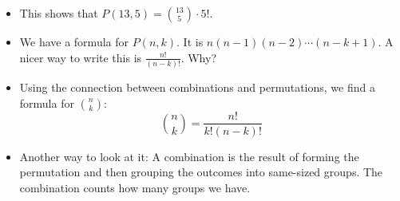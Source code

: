 \documentclass[12pt]{article}
\theoremstyle{plain}
\theoremstyle{definition}
\theoremstyle{remark}
\newcommand{\ex}{\noindent\textbf{Ex:} }
\begin{document}
\begin{itemize}
\item This shows that $P(13,5) = \binom{13}{5}\cdot 5!$.


   \item We have a formula for $P(n,k)$.  It is $n(n-1)(n-2)\cdots(n-k+1)$.  A nicer way to write this is $\frac{n!}{(n-k)!}$.   Why?



 \item Using the connection between combinations and permutations, we find a formula for $\binom{n}{k}$:
 \[\binom{n}{k} = \frac{n!}{k!(n-k)!}\]


\item Another way to look at it: A combination is the result of forming the permutation and then grouping the outcomes into same-sized groups.  The combination counts how many groups we have.



 \end{itemize}
\end{document}
